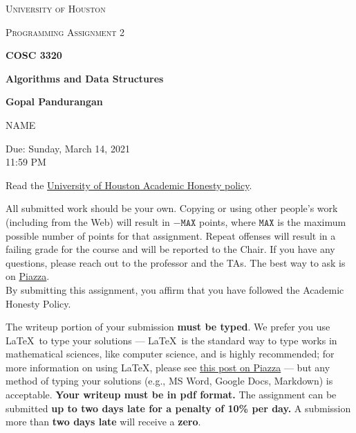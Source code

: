\documentclass[draft]{article}
\begin{document}
\begin{titlepage}
    \begin{center}
        {\scshape\LARGE University of Houston\par}
        \vspace{1cm}
        {\scshape\Large Programming Assignment 2 \par}
        \vspace{1.5cm}
        {\huge\bfseries COSC 3320 \par}
        {\huge\bfseries Algorithms and Data Structures \par}
        \vspace{0.5cm}
        {\large\bfseries Gopal Pandurangan\par}
        \vspace{2cm}
        {\Large NAME\par}
        \vspace{0.5cm}
        {\large \par} Due: Sunday, March 14, 2021\\11:59 PM
    \end{center}


    Read the \href{https://www.uh.edu/provost/policies-resources/honesty/_documents-honesty/academic-honesty-policy.pdf}{University of Houston Academic Honesty policy}.

    \begin{tcolorbox}[title=Academic Honesty Policy,colback=red!15,colframe=red!65!black,fonttitle=\bfseries]All submitted work should be your own. Copying or using other people's work (including from the Web) will result in \(-\texttt{MAX}\) points, where \(\texttt{MAX}\) is the maximum possible number of points for that assignment. Repeat offenses will result in a failing grade for the course and will be reported to the Chair. If you have any questions, please reach out to the professor and the TAs. The best way to ask is on \href{https://piazza.com/uh/spring2021/cosc3320/home}{Piazza}.\\

        By submitting this assignment, you affirm that you have followed the Academic Honesty Policy.
    \end{tcolorbox}

    The writeup portion of your submission \textbf{must be typed}. We prefer you use \LaTeX~to type your solutions --- \LaTeX~is the standard way to type works in mathematical sciences, like computer science, and is highly recommended; for more information on using \LaTeX, please see \href{https://piazza.com/class/kjxhee6ctqe6cj?cid=8}{this post on Piazza} --- but any method of typing your solutions (e.g., MS Word, Google Docs, Markdown) is acceptable. \textbf{Your writeup must be in pdf format.} The assignment can be submitted \textbf{up to two days late for a penalty of 10\% per day.} A submission more than \textbf{two days late} will receive a \textbf{zero}.


\end{titlepage}
\end{document}
